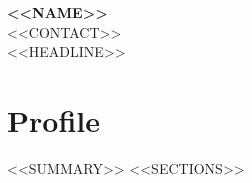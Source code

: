 \documentclass[10pt,a4paper]{article}
\begin{document}
{\LARGE\textbf{<<NAME>>}}\\[5pt]
<<CONTACT>>\\[8pt]
{\large <<HEADLINE>>}
\section*{Profile}
<<SUMMARY>>
<<SECTIONS>>
\end{document}
